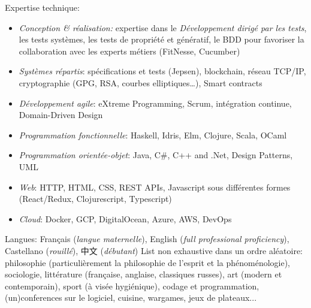\documentclass[12pt,a4paper]{article}
\begin{document}




\inlineheadsection
    {Expertise technique:}
    {
      \begin{itemize}
      \item \emph{Conception \& réalisation:} expertise dans le \emph{Développement dirigé par les tests}, les tests systèmes, les tests de propriété et génératif, le BDD pour favoriser la collaboration avec les experts métiers (FitNesse, Cucumber)
      \item \emph{Systèmes répartis}: spécifications et tests (Jepsen), blockchain, réseau TCP/IP, cryptographie (GPG, RSA, courbes elliptiques\dots), Smart contracts
      \item \emph{Développement agile}: eXtreme Programming, Scrum, intégration continue, Domain-Driven Design
      \item \emph{Programmation fonctionnelle}: Haskell, Idris, Elm, Clojure, Scala, OCaml
      \item \emph{Programmation orientée-objet}: Java, C\#, C++ and .Net, Design Patterns, UML
      \item \emph{Web}: HTTP, HTML, CSS, REST APIs, Javascript sous différentes formes (React/Redux, Clojurescript, Typescript)
      \item \emph{Cloud}: Docker, GCP, DigitalOcean, Azure, AWS, DevOps
      \end{itemize}
    }

    \vspace{1em}
\inlineheadsection
    {Langues:}
    {Français (\emph{langue maternelle}), English (\emph{full professional proficiency}), Castellano (\emph{rouillé}), 中文 (\emph{débutant})}
\inlineheadsection
    {List non exhaustive dans un ordre aléatoire: }{philosophie (particulièrement la philosophie de l'esprit et la phénoménologie), sociologie, littérature (française, anglaise, classiques russes), art (modern et contemporain), sport (à visée hygiénique), codage et programmation, (un)conferences sur le logiciel, cuisine, wargames, jeux de plateaux...}
\end{document}
